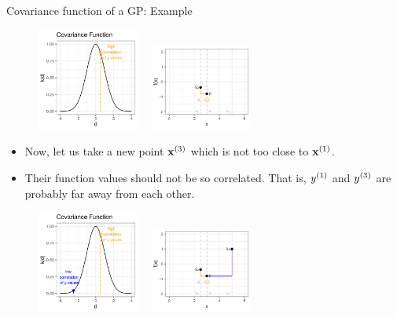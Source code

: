 \begin{frame}[c,allowframebreaks]{Covariance function of a GP: Example}
\begin{figure}
\includegraphics[width=0.3\textwidth]{figure_man/covariance2point/example_covariance_1.png} ~
\includegraphics[width=0.3\textwidth]{figure_man/covariance2point/example_function_1-2.png}
\end{figure}


\framebreak

\begin{itemize}
\item Now, let us take a new point $\mathbf{x}^{(3)}$ which is not too close to $\mathbf{x}^{(1)}$.
  
\vspace{.3cm}
\item Their function values should not be so correlated. That is, $y^{(1)}$ and $y^{(3)}$ are probably far away from each other.
\end{itemize}

\vspace{.3cm}

\begin{figure}
\includegraphics[width=0.3\textwidth]{figure_man/covariance2point/example_covariance_2.png} ~      
\includegraphics[width=0.3\textwidth]{figure_man/covariance2point/example_function_2-1.png}
\end{figure}

\end{frame}

